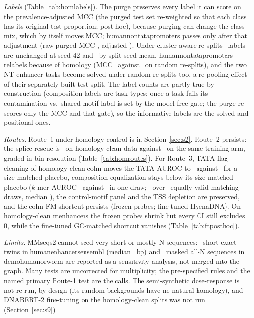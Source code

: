 \documentclass[journal,onecolumn,10pt,letterpaper]{IEEEtran}
\newcommand{\tasku}{\textunderscore\allowbreak}
\DeclareRobustCommand{\task}[1]{{\normalfont\ttfamily\upshape\let\_\tasku #1}}
\begin{document}
\emph{Labels} (Table~\ref{tab:homlabels}). The purge preserves every label it can score on the
prevalence-adjusted MCC (the purged test set re-weighted so that each class has its original test
proportion; post hoc), because purging can change the class mix, which by itself moves MCC;
\task{human\_nontata\_promoters} passes only after that adjustment (raw purged MCC \smHomNontataRaw,
adjusted \smHomNontataStd). Under cluster-aware re-splits \smHomLabelsSFortyTwo\
labels are unchanged at seed 42 and \smHomLabelsMean\ by split-seed mean.
\task{human\_nontata\_promoters} relabels because of homology (MCC \smHomNontataCl\ against
\smHomNontataRa\ on random re-splits), and the two NT enhancer tasks become solved under random
re-splits too, a re-pooling effect of their separately built test split. The label counts are partly
true by construction (composition labels are task types; once a task fails its contamination vs.\
shared-motif label is set by the model-free gate; the purge re-scores only the MCC and that gate), so
the informative labels are the solved and positional ones.

\emph{Routes.} Route~1 under homology control is in Section~\ref{sec:s2}. Route~2 persists: the splice
rescue is \smHcSplice\ on homology-clean data against \smHcSpliceOrig\ on the same training arm, graded
in bin resolution (Table~\ref{tab:homroutes}). For Route~3, TATA-flag cleaning of homology-clean
\task{cohn} moves the TATA AUROC to \smHcTataFlag\ against \smHcTataPlacebo\ for a size-matched
placebo, composition equalization stays below its size-matched placebo ($k$-mer AUROC \smHcEqK\
against \smHcEqPlacebo\ in one draw; \smHcEqDrawRange\ over \smHcEqDraws\ equally valid matching draws,
median \smHcEqDrawMed), the control-motif panel and the TSS depletion are preserved, and the \task{cohn}
FM shortcut persists (frozen probes; fine-tuned HyenaDNA). On homology-clean \task{nt\_enhancers} the frozen probes
shrink but every CI still excludes 0, while the fine-tuned GC-matched shortcut vanishes
(Table~\ref{tab:ftposthoc}).

\emph{Limits.} MMseqs2 cannot seed very short or mostly-N sequences: \smMissedEnh\ short exact twins in
\task{human\_enhancers\_ensembl} (median \smMissedEnhLen\ bp) and \smMissedWorm\ masked all-N sequences in
\task{demo\_human\_or\_worm} are reported as a sensitivity analysis, not merged into the graph.
Many tests are uncorrected for multiplicity; the pre-specified rules and the named primary Route-1 test
are the calls. The semi-synthetic dose-response is not re-run, by design (its random backgrounds have
no natural homology), and DNABERT-2 fine-tuning on the homology-clean splits was not run
(Section~\ref{sec:s9}).
\end{document}
